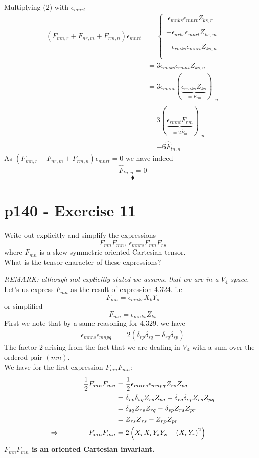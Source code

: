 Multiplying (2) with $\epsilon_{mnrt}$ 
\begin{align}
\left(F_{mn,r}+F_{nr,m}+F_{rm,n}\right)\epsilon_{mnrt}&=\left\{\begin{array}{l}
\ \epsilon_{mnks} \epsilon_{mnrt} Z_{ks,r}\\\\
+\epsilon_{nrks} \epsilon_{mnrt} Z_{ks,m}\\\\
+\epsilon_{rmks}\epsilon_{mnrt} Z_{ks,n}\\\\
\end{array}\right.\\
&=3\epsilon_{rmks}\epsilon_{rmnt} Z_{ks,n}\\
&=3\epsilon_{rmnt} \left(\underbrace{\epsilon_{rmks}Z_{ks}}_{=F_{rm}} \right)_{,n}\\
&=3\left(\underbrace{\epsilon_{rmnt} F_{rm}}_{=2\hat{F}_{nt}}  \right)_{,n}\\
&=-6\hat{F}_{tn,n}
\end{align}
As $\left(F_{mn,r}+F_{nr,m}+F_{rm,n}\right)\epsilon_{mnrt}=0$ we have indeed $$\hat{F}_{tn,n}=0$$
$$\blacklozenge$$
\newpage

\section{p140 - Exercise 11}
\begin{tcolorbox}
Write out explicitly and simplify the expressions $$F_{mn}F_{mn}, \ \epsilon_{mnrs} F_{mn}F_{rs} $$ where  $F_{mn}$ is a skew-symmetric oriented Cartesian tensor.\\
What is the tensor character of these expressions?
\end{tcolorbox}
\textit{REMARK: although not explicitly stated we assume that we are in a $V_4$-space.}\\
Let's us express $F_{mn}$ as the result of expression $\mathbf{4.324.} $ i.e $$F_{mn} = \epsilon_{mnks} X_kY_s$$ or simplified $$F_{mn} = \epsilon_{mnks} Z_{ks}$$
First we note that by a same reasoning for $\mathbf{4.329.}$ we have
\begin{align*}
\epsilon_{mnrs}\epsilon_{mnpq} &= 2\left(\delta_{rp}\delta_{sq}-\delta_{rq}\delta_{sp}\right)
\end{align*} 
The factor $2$ arising from the fact that we are dealing in $V_4$ with a sum over the ordered pair $(mn)$.\\
 We have for the first  expression $F_{mn}F_{mn}$:
\begin{align*}
\frac{1}{2} F_{mn}F_{mn}&=\frac{1}{2}\epsilon_{mnrs}\epsilon_{mnpq} Z_{rs} Z_{pq}\\
&=\delta_{rp}\delta_{sq}Z_{rs} Z_{pq}-\delta_{rq}\delta_{sp}Z_{rs} Z_{pq}\\
&=\delta_{sq}Z_{rs} Z_{rq}-\delta_{sp}Z_{rs} Z_{pr}\\
&=Z_{rs} Z_{rs}-Z_{rp} Z_{pr}\\
\Rightarrow \quad\quad\quad\quad F_{mn}F_{mn}&=2\left(X_r X_r Y_s Y_s - \left(X_r Y_r\right)^2\right)
\end{align*}
\textbf{$F_{mn}F_{mn}$ is an oriented Cartesian invariant.}


